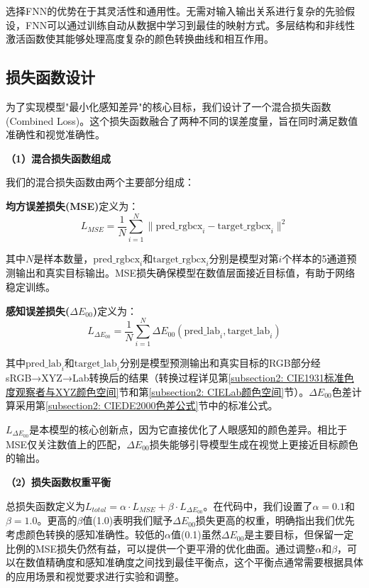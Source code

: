 选择FNN的优势在于其灵活性和通用性。无需对输入输出关系进行复杂的先验假设，FNN可以通过训练自动从数据中学习到最佳的映射方式。多层结构和非线性激活函数使其能够处理高度复杂的颜色转换曲线和相互作用。\cite{1024493909.nh}

\subsection[\hspace{-2pt}损失函数设计]{{\heiti{} \hspace{-8pt}损失函数设计}}\label{section2: 损失函数设计}

为了实现模型"最小化感知差异"的核心目标，我们设计了一个混合损失函数 (Combined Loss)。这个损失函数融合了两种不同的误差度量，旨在同时满足数值准确性和视觉准确性。

\noindent\textbf{（1）混合损失函数组成}

我们的混合损失函数由两个主要部分组成：

\textbf{均方误差损失(MSE)}定义为：
\begin{equation}
L_{MSE} = \frac{1}{N} \sum_{i=1}^N \| \text{pred\_rgbcx}_i - \text{target\_rgbcx}_i \|^2
\end{equation}

其中$N$是样本数量，$\text{pred\_rgbcx}_i$和$\text{target\_rgbcx}_i$分别是模型对第$i$个样本的5通道预测输出和真实目标输出。MSE损失确保模型在数值层面接近目标值，有助于网络稳定训练。

\textbf{感知误差损失($\Delta E_{00}$)}定义为：
\begin{equation}
L_{\Delta E_{00}} = \frac{1}{N} \sum_{i=1}^N \Delta E_{00}(\text{pred\_lab}_i, \text{target\_lab}_i)
\end{equation}

其中$\text{pred\_lab}_i$和$\text{target\_lab}_i$分别是模型预测输出和真实目标的RGB部分经sRGB→XYZ→Lab转换后的结果（转换过程详见第\ref{subsection2: CIE1931标准色度观察者与XYZ颜色空间}节和第\ref{subsection2: CIELab颜色空间}节）。$\Delta E_{00}$色差计算采用第\ref{subsection2: CIEDE2000色差公式}节中的标准公式。

$L_{\Delta E_{00}}$是本模型的核心创新点，因为它直接优化了人眼感知的颜色差异。相比于MSE仅关注数值上的匹配，$\Delta E_{00}$损失能够引导模型生成在视觉上更接近目标颜色的输出。

\noindent\textbf{（2）损失函数权重平衡}

总损失函数定义为$ L_{total} = \alpha \cdot L_{MSE} + \beta \cdot L_{\Delta E_{00}} $。在代码中，我们设置了$\alpha=0.1$和$\beta=1.0$。更高的$\beta$值(1.0)表明我们赋予$\Delta E_{00}$损失更高的权重，明确指出我们优先考虑颜色转换的感知准确性。较低的$\alpha$值(0.1)虽然$\Delta E_{00}$是主要目标，但保留一定比例的MSE损失仍然有益，可以提供一个更平滑的优化曲面。通过调整$\alpha$和$\beta$，可以在数值精确度和感知准确度之间找到最佳平衡点，这个平衡点通常需要根据具体的应用场景和视觉要求进行实验和调整。

